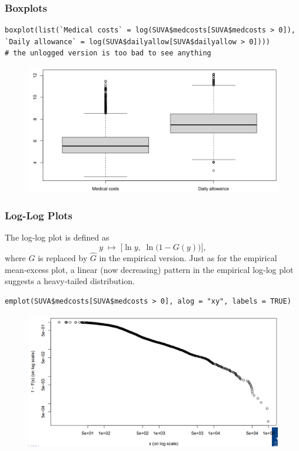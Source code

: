 \documentclass[11pt]{article}
\newcommand{\noi}{\noindent}
\begin{document}
\subsubsection{Boxplots}
\begin{lstlisting}
boxplot(list(`Medical costs` = log(SUVA$medcosts[SUVA$medcosts > 0]),
`Daily allowance` = log(SUVA$dailyallow[SUVA$dailyallow > 0])))
# the unlogged version is too bad to see anything
\end{lstlisting}
\begin{figure}[H]
    \centering
    \includegraphics[width=0.7\linewidth]{SUVA - Box Plots.png}
\end{figure}

\subsubsection{Log-Log Plots}
\noi The log‐log plot is defined as
\[
y\;\mapsto\;\bigl[\ln y,\;\ln\bigl(1 - G(y)\bigr)\bigr],
\]
where \(G\) is replaced by \(\widehat G\) in the empirical version.  Just as for the empirical mean‐excess plot, a linear (now decreasing) pattern in the empirical log‐log plot suggests a heavy‐tailed distribution.

\begin{lstlisting}
emplot(SUVA$medcosts[SUVA$medcosts > 0], alog = "xy", labels = TRUE)
\end{lstlisting}
\begin{figure}[H]
    \centering
    \includegraphics[width=0.7\linewidth]{SUVA - Log-Log - MedCosts.png}
\end{figure}
\end{document}
